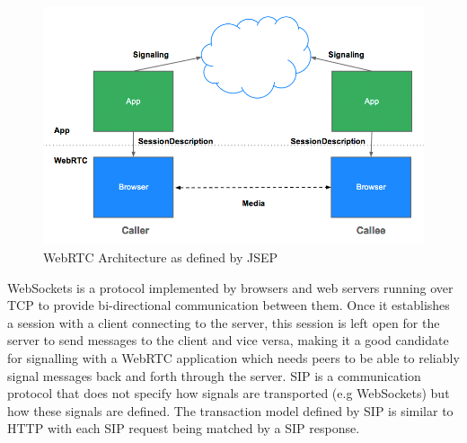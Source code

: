 \documentclass[]{report}
\begin{document}
			\begin{figure}[h!]
				\caption{WebRTC Architecture as defined by JSEP \cite{JSEP}}
				\includegraphics[scale=0.4]{jsep.png}
			\end{figure}
			\newpage
			
			WebSockets is a protocol implemented by browsers and web servers running over TCP to provide bi-directional communication between them. Once it establishes a session with a client connecting to the server, this session is left open for the server to send messages to the client and vice versa, making it a good candidate for signalling with a WebRTC application which needs peers to be able to reliably signal messages back and forth through the server. SIP is a communication protocol that does not specify how signals are transported (e.g WebSockets) but how these signals are defined. The transaction model defined by SIP is similar to HTTP with each SIP request being matched by a SIP response.
			
\end{document}
